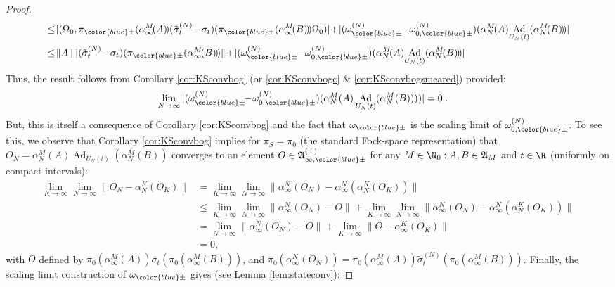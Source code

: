 \documentclass[a4paper, 11pt]{article}
\newcommand{\fA}{\mathfrak{A}}\newcommand{\cA}{\mathcal{A}}\newcommand{\dA}{\mathds{A}}\newcommand{\sA}{\mathscr{A}}
\DeclareMathOperator{\Ad}{Ad}
\DeclareMathOperator{\1}{\mathds{1}}
\begin{document}
\begin{proof}
\begin{align*}
&\!\leq\!|(\Omega_{0},\pi_{{\color{blue}\pm}}(\alpha^{M}_{\infty}\!(A)\!)(\tilde{\sigma}^{(N)}_{t}\!-\!\sigma_{t})(\pi_{{\color{blue}\pm}}(\alpha^{M}_{\infty}\!(B)\!)\!)\Omega_{0})|\!+\!|(\omega^{(N)}_{{\color{blue}\pm}}\!\!-\!\omega^{(N)}_{0,{\color{blue}\pm}})(\alpha^{M}_{N}\!(A)\!\Ad_{U_{N}(t)}(\alpha^{M}_{N}\!(B)\!)\!)| \\
&\!\leq\!\|A\|\|(\tilde{\sigma}^{(N)}_{t}\!-\!\sigma_{t})(\pi_{{\color{blue}\pm}}(\alpha^{M}_{\infty}\!(B)\!)\!)\|\!+\!|(\omega^{(N)}_{{\color{blue}\pm}}\!\!-\!\omega^{(N)}_{0,{\color{blue}\pm}})(\alpha^{M}_{N}\!(A)\!\Ad_{U_{N}(t)}(\alpha^{M}_{N}\!(B)\!)\!)|
\end{align*}
Thus, the result follows from Corollary \ref{cor:KSconvbog} (or \ref{cor:KSconvbogc} \& \ref{cor:KSconvbogsmeared}) provided:
\begin{align*}
\lim_{N\rightarrow\infty}|(\omega^{(N)}_{{\color{blue}\pm}}\!\!-\!\omega^{(N)}_{0,{\color{blue}\pm}})(\alpha^{M}_{N}(A)\Ad_{U_{N}(t)}(\alpha^{M}_{N}(B))))| & = 0\;.
\end{align*}
But, this is itself a consequence of Corollary \ref{cor:KSconvbog} and the fact that $\omega_{{\color{blue}\pm}}$ is the scaling limit of $\omega^{(N)}_{0,{\color{blue}\pm}}$. To see this, we observe that Corollary \ref{cor:KSconvbog} implies for $\pi_{S} = \pi_{0}$ (the standard Fock-space representation) that $O_{N} = \alpha^{M}_{N}(A)\Ad_{U_{N}(t)}(\alpha^{M}_{N}(B))$ converges to an element $O\in\fA^{(\pm)}_{\infty,{\color{blue}\pm}}$ for any $M\in\N_{0}: A,B\in\fA_{M}$ and $t\in\R$ (uniformly on compact intervals):
\begin{align*}
\lim_{K\rightarrow\infty}\lim_{N\rightarrow\infty}\!\!\|O_{N}\!-\!\alpha^{K}_{N}(O_{K})\| &\!=\!\lim_{K\rightarrow\infty}\lim_{N\rightarrow\infty}\!\!\|\alpha^{N}_{\infty}(O_{N})\!-\!\alpha^{N}_{\infty}(\alpha^{K}_{N}(O_{K})\!)\| \\
& \!\leq\!\lim_{K\rightarrow\infty}\lim_{N\rightarrow\infty}\!\!\|\alpha^{N}_{\infty}\!(O_{N})\!-\!O\|\!+\!\lim_{K\rightarrow\infty}\lim_{N\rightarrow\infty}\!\!\|\alpha^{N}_{\infty}\!(O_{N})\!-\!\alpha^{N}_{\infty}\!(\alpha^{K}_{N}\!(O_{K})\!)\| \\
& = \lim_{N\rightarrow\infty}\|\alpha^{N}_{\infty}(O_{N})-O\| + \lim_{K\rightarrow\infty}\|O-\alpha^{K}_{\infty}(O_{K})\| \\
& = 0,
\end{align*}
with $O$ defined by $\pi_{0}(\alpha^{M}_{\infty}(A)\!)\sigma_{t}(\pi_{0}(\alpha^{M}_{\infty}(B)\!)\!)$, and $\pi_{0}(\alpha^{N}_{\infty}(O_{N})\!)\!=\!\pi_{0}(\alpha^{M}_{\infty}(A)\!)\tilde{\sigma}^{(N)}_{t}\!(\pi_{0}(\alpha^{M}_{\infty}(B)\!)\!)$. Finally, the scaling limit construction of $\omega_{{\color{blue}\pm}}$ gives (see Lemma \ref{lem:stateconv}):

\end{proof}
\end{document}
